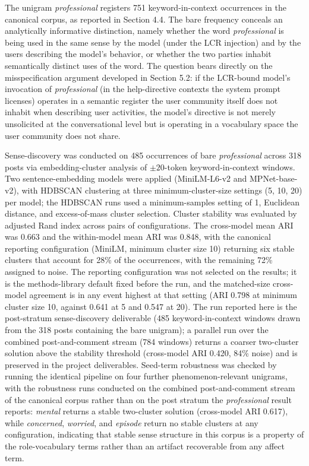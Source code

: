 \documentclass[11pt]{article}
\begin{document}
The unigram \emph{professional} registers 751 keyword-in-context occurrences in the canonical corpus, as reported in Section 4.4. The bare frequency conceals an analytically informative distinction, namely whether the word \emph{professional} is being used in the same sense by the model (under the LCR injection) and by the users describing the model's behavior, or whether the two parties inhabit semantically distinct uses of the word. The question bears directly on the misspecification argument developed in Section 5.2: if the LCR-bound model's invocation of \emph{professional} (in the help-directive contexts the system prompt licenses) operates in a semantic register the user community itself does not inhabit when describing user activities, the model's directive is not merely unsolicited at the conversational level but is operating in a vocabulary space the user community does not share.

Sense-discovery was conducted on 485 occurrences of bare \emph{professional} across 318 posts via embedding-cluster analysis of $\pm 20$-token keyword-in-context windows. Two sentence-embedding models were applied (MiniLM-L6-v2 and MPNet-base-v2), with HDBSCAN clustering at three minimum-cluster-size settings (5, 10, 20) per model; the HDBSCAN runs used a minimum-samples setting of 1, Euclidean distance, and excess-of-mass cluster selection. Cluster stability was evaluated by adjusted Rand index across pairs of configurations. The cross-model mean ARI was 0.663 and the within-model mean ARI was 0.848, with the canonical reporting configuration (MiniLM, minimum cluster size 10) returning six stable clusters that account for 28\% of the occurrences, with the remaining 72\% assigned to noise. The reporting configuration was not selected on the results; it is the methods-library default fixed before the run, and the matched-size cross-model agreement is in any event highest at that setting (ARI 0.798 at minimum cluster size 10, against 0.641 at 5 and 0.547 at 20). The run reported here is the post-stratum sense-discovery deliverable (485 keyword-in-context windows drawn from the 318 posts containing the bare unigram); a parallel run over the combined post-and-comment stream (784 windows) returns a coarser two-cluster solution above the stability threshold (cross-model ARI 0.420, 84\% noise) and is preserved in the project deliverables. Seed-term robustness was checked by running the identical pipeline on four further phenomenon-relevant unigrams, with the robustness runs conducted on the combined post-and-comment stream of the canonical corpus rather than on the post stratum the \emph{professional} result reports: \emph{mental} returns a stable two-cluster solution (cross-model ARI 0.617), while \emph{concerned}, \emph{worried}, and \emph{episode} return no stable clusters at any configuration, indicating that stable sense structure in this corpus is a property of the role-vocabulary terms rather than an artifact recoverable from any affect term.
\end{document}
